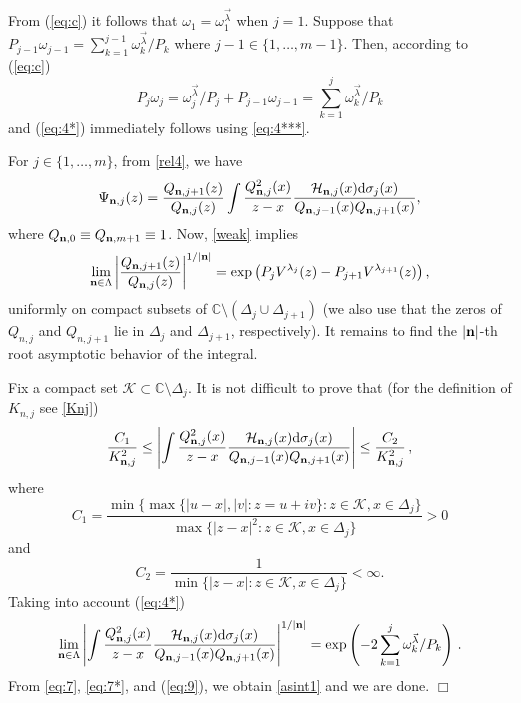 \documentclass{amsart}
\theoremstyle{definition}
\theoremstyle{remark}
\begin{document}
From (\ref{eq:c}) it follows that
$\omega_{1} = \omega_{1}^{\vec{\lambda}}$ when
$j=1.$  Suppose that $ P_{j-1}\omega_{j-1} = \sum_{k=1}^{j-1}
 {\omega_{k}^{\vec{\lambda}}}/P_k$ where $j-1 \in
\{1,\ldots,m-1\}$. Then, according to (\ref{eq:c})
\[ P_j \omega_j = {\omega_j^{\vec{\lambda}}}/P_j  +
 P_{j-1}\omega_{j-1} = \sum_{k=1}^{j}
 {\omega_{k}^{\vec{\lambda}}}/P_k
\]
and (\ref{eq:4*}) immediately follows using \eqref{eq:4***}.


For $j \in \{1,\ldots,m\}$, from \eqref{rel4}, we have
\begin{equation} \label{eq:7} \Psi_{{\bf n},j}(z) = \frac{Q_{{\bf n},j+1}(z)}{Q_{{\bf n},j}(z)}\int \frac{ Q^2_{{\bf n},j}(x)}{z-x} \frac{\mathcal{H}_{{\bf n},j}(x){\rm d}\sigma_{j}(x)}{Q_{{\bf n},j-1}(x)Q_{{\bf n},j+1}(x)},
\end{equation}
where $Q_{{\bf n},0}\equiv Q_{{\bf n},m+1} \equiv 1$. Now, \eqref{weak} implies
\begin{equation} \label{eq:7*} \lim_{{\bf n} \in \Lambda}\left|\frac{Q_{{\bf n},j+1}(z)}{Q_{{\bf n},j}(z)}\right|^{ {1}/|{\bf n}|}=\exp\left(
P_j V^{{\lambda}_{j}}(z)- P_{j+1}V^{ {\lambda}_{j+1}}(z)\right),
\end{equation}
uniformly on compact subsets of $\mathbb{C} \setminus (\Delta_j \cup
\Delta_{j+1})$ (we also use that the zeros of $Q_{n,j}$ and $Q_{n,j+1}$ lie in $\Delta_j$ and $\Delta_{j+1}$, respectively). It
remains to find the $|{\bf n}|$-th root asymptotic behavior of
the integral.

Fix a compact set $\mathcal{K} \subset \mathbb{C} \setminus
\Delta_{j}.$
It is not difficult to prove that (for the definition of
$K_{n,j}$ see \eqref{Knj})
\[ \frac{C_1}{K_{{\bf n},j}^2} \leq \left|\int \frac{ Q^2_{{\bf n},j}(x)}{z-x} \frac{\mathcal{H}_{{\bf n},j}(x){\rm d}\sigma_{j}(x)}{Q_{{\bf n},j-1}(x)Q_{{\bf n},j+1}(x)}\right| \leq \frac{C_2}{K_{{\bf
n},j}^2} \,,
\]
where
\[ C_1 = \frac{\min \{ \max\{|u-x|,|v|: z = u+iv\}: z \in \mathcal{K}, x
\in \Delta_{j}\}}{ \max\{|z-x|^2: z \in \mathcal{K}, x \in
\Delta_{j}\}} > 0
\]
and
\[ C_2 = \frac{1}{\min\{|z-x|: z \in \mathcal{K}, x \in
\Delta_{j}\}} < \infty.
\]
Taking into account (\ref{eq:4*})
\begin{equation}\label{eq:9}
\lim_{{\bf n} \in \Lambda} \left|\int \frac{ Q^2_{{\bf n},j}(x)}{z-x} \frac{\mathcal{H}_{{\bf n},j}(x){\rm d}\sigma_{j}(x)}{Q_{{\bf n},j-1}(x)Q_{{\bf n},j+1}(x)}\right|^{1/|{\bf n}|} = \exp\left(-2 \sum_{k=1}^{j}
{\omega_k^{\vec{\lambda}}/P_k} \right) \,.
\end{equation}
From \eqref{eq:7},  \eqref{eq:7*}, and (\ref{eq:9}), we obtain \eqref{asint1} and we
are done.
\hfill $\Box$
\end{document}
